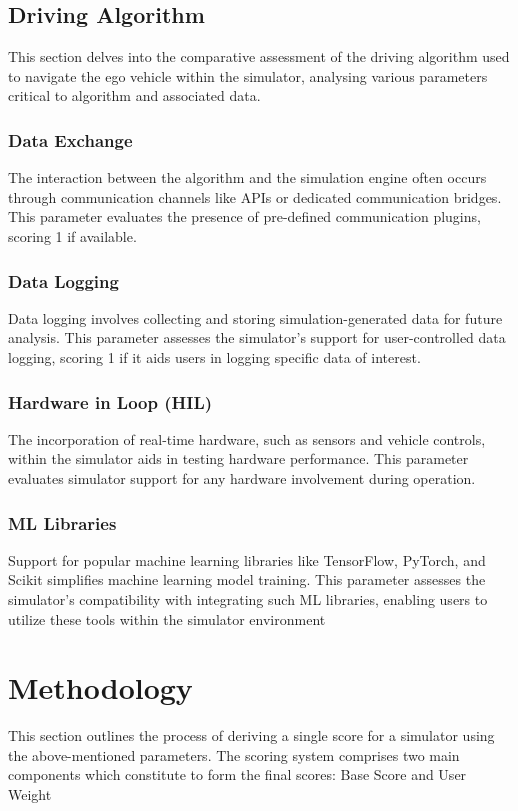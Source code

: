 \documentclass[12pt,twoside,a4paper,parskip]{scrbook} %
\begin{document}
\subsection{Driving Algorithm}
This section delves into the comparative assessment of the driving algorithm used to navigate the ego vehicle within the simulator, analysing various parameters critical to algorithm and associated data.

\subsubsection{Data Exchange} 
The interaction between the algorithm and the simulation engine often occurs through communication channels like APIs or dedicated communication bridges. This parameter evaluates the presence of pre-defined communication plugins, scoring 1 if available.

\subsubsection{Data Logging}
Data logging involves collecting and storing simulation-generated data for future analysis. This parameter assesses the simulator's support for user-controlled data logging, scoring 1 if it aids users in logging specific data of interest.

\subsubsection{Hardware in Loop (HIL)}
The incorporation of real-time hardware, such as sensors and vehicle controls, within the simulator aids in testing hardware performance. This parameter evaluates simulator support for any hardware involvement during operation.

\subsubsection{ML Libraries}
Support for popular machine learning libraries like TensorFlow, PyTorch, and Scikit simplifies machine learning model training. This parameter assesses the simulator's compatibility with integrating such ML libraries, enabling users to utilize these tools within the simulator environment

\section{Methodology}
This section outlines the process of deriving a single score for a simulator using the above-mentioned parameters. The scoring system comprises two main components which constitute to form the final scores: Base Score and User Weight
\end{document}
